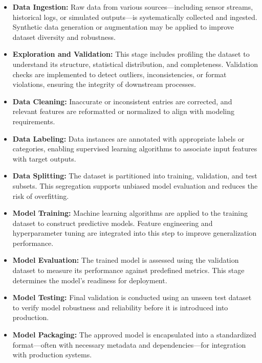\begin{itemize}
    \item \textbf{Data Ingestion:} Raw data from various sources—including sensor streams, historical logs, or simulated outputs—is systematically collected and ingested. Synthetic data generation or augmentation may be applied to improve dataset diversity and robustness.
    
    \item \textbf{Exploration and Validation:} This stage includes profiling the dataset to understand its structure, statistical distribution, and completeness. Validation checks are implemented to detect outliers, inconsistencies, or format violations, ensuring the integrity of downstream processes.
    
    \item \textbf{Data Cleaning:} Inaccurate or inconsistent entries are corrected, and relevant features are reformatted or normalized to align with modeling requirements.
    
    \item \textbf{Data Labeling:} Data instances are annotated with appropriate labels or categories, enabling supervised learning algorithms to associate input features with target outputs.
    
    \item \textbf{Data Splitting:} The dataset is partitioned into training, validation, and test subsets. This segregation supports unbiased model evaluation and reduces the risk of overfitting.
    
    \item \textbf{Model Training:} Machine learning algorithms are applied to the training dataset to construct predictive models. Feature engineering and hyperparameter tuning are integrated into this step to improve generalization performance.
    
    \item \textbf{Model Evaluation:} The trained model is assessed using the validation dataset to measure its performance against predefined metrics. This stage determines the model's readiness for deployment.
    
    \item \textbf{Model Testing:} Final validation is conducted using an unseen test dataset to verify model robustness and reliability before it is introduced into production.
    
    \item \textbf{Model Packaging:} The approved model is encapsulated into a standardized format—often with necessary metadata and dependencies—for integration with production systems.
    

\end{itemize}
